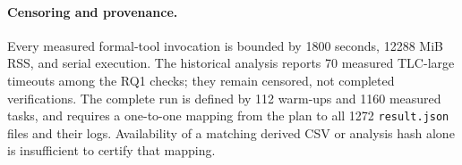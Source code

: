 \paragraph{Censoring and provenance.}
Every measured formal-tool invocation is bounded by 1800 seconds, 12288 MiB
RSS, and serial execution. The historical analysis reports 70 measured
TLC-large timeouts among the RQ1 checks; they remain censored, not completed
verifications. The complete run is defined by 112 warm-ups and 1160 measured
tasks, and requires a one-to-one mapping from the plan to all 1272
\texttt{result.json} files and their logs. Availability of a matching derived
CSV or analysis hash alone is insufficient to certify that mapping.
